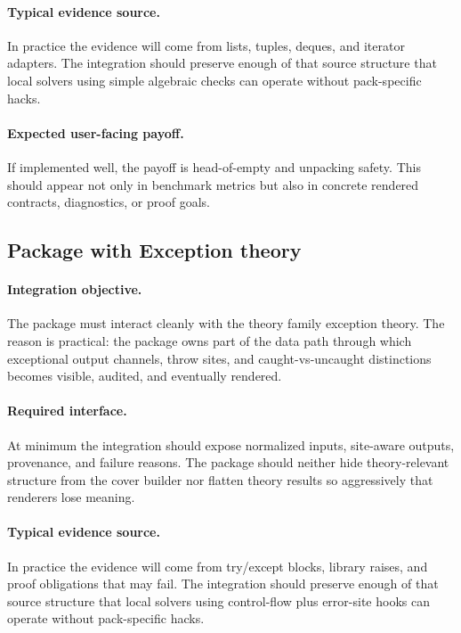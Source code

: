 \documentclass[11pt]{report}
\DeclareRobustCommand{\py}[1]{\texttt{\detokenize{#1}}}
\theoremstyle{definition}
\theoremstyle{plain}
\begin{document}
\paragraph{Typical evidence source.}
In practice the evidence will come from lists, tuples, deques, and iterator adapters. The integration should
preserve enough of that source structure that local solvers using simple algebraic checks
can operate without pack-specific hacks.

\paragraph{Expected user-facing payoff.}
If implemented well, the payoff is head-of-empty and unpacking safety. This should appear not only
in benchmark metrics but also in concrete rendered contracts,
diagnostics, or proof goals.


\subsection{Package \py{src/deppy/core} with Exception theory}

\paragraph{Integration objective.}
The package \py{src/deppy/core} must interact cleanly with the
theory family exception theory. The reason is practical: the
package owns part of the data path through which exceptional output channels, throw sites, and caught-vs-uncaught distinctions becomes
visible, audited, and eventually rendered.

\paragraph{Required interface.}
At minimum the integration should expose normalized inputs, site-aware
outputs, provenance, and failure reasons. The package should neither hide
theory-relevant structure from the cover builder nor flatten theory
results so aggressively that renderers lose meaning.

\paragraph{Typical evidence source.}
In practice the evidence will come from try/except blocks, library raises, and proof obligations that may fail. The integration should
preserve enough of that source structure that local solvers using control-flow plus error-site hooks
can operate without pack-specific hacks.
\end{document}

